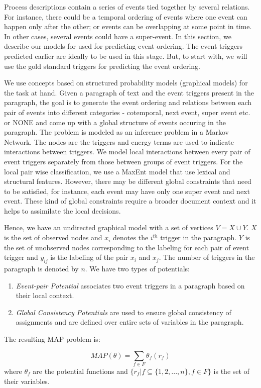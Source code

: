 Process descriptions contain a series of events tied together by several relations. For instance, there could be a temporal ordering of events where one event can happen only after the other; or events can be overlapping at some point in time. In other cases, several events could have a super-event. In this section, we describe our models for used for predicting event ordering. The event triggers predicted earlier are ideally to be used in this stage. But, to start with, we will use the gold standard triggers for predicting the event ordering.

We use concepts based on structured probability models (graphical models) for the task at hand. Given a paragraph of text and the event triggers present in the paragraph, the goal is to generate the event ordering and relations between each pair of events into different categories - cotemporal, next event, super event etc. or NONE and come up with a global structure of events occuring in the paragraph. The problem is modeled as an inference problem in a Markov Network. The nodes are the triggers and energy terms are used to indicate interactions between triggers. We model local interactions between every pair of event triggers separately from those between groups of event triggers. For the local pair wise classification, we use a MaxEnt model that use lexical and structural features. However, there may be different global constraints that need to be satisfied, for instance, each event may have only one super event and next event. These kind of global constraints require a broader document context and it helps to assimilate the local decisions.

Hence, we have an undirected graphical model with a set of vertices $V = X \cup Y$. $X$ is the set of observed nodes and $x_i$ denotes the $i^{th}$ trigger in the paragraph. $Y$ is the set of unobserved nodes corresponding to the labeling for each pair of event trigger and $y_{ij}$ is the labeling of the pair $x_i$ and $x_j$. The number of triggers in the paragraph is denoted by $n$. We have two types of potentials:

\begin{enumerate}
\item {\em Event-pair Potential} associates two event triggers in a paragraph based on their local context.
\item {\em Global Consistency Potentials} are used to ensure global consistency of assignments and are defined over entire sets of variables in the paragraph.
\end{enumerate}

The resulting MAP problem is:

\begin{equation}
MAP(\theta) = \sum_{f \in F} \theta_f(r_f)
\end{equation}
where $\theta_f$ are the potential functions and $\{r_f|f\subseteq\{1,2,...,n\}, f \in F\}$ is the set of their variables.